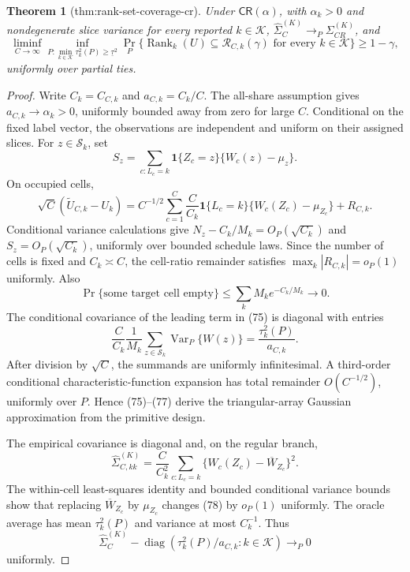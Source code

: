 \documentclass{article}
\newtheorem{theorem}{Theorem}
\begin{document}
\begin{theorem}[thm:rank-set-coverage-cr]\label{thm:rank-set-coverage-cr}
Under \(\mathsf{CR}(\alpha)\), with \(\alpha_k>0\) and nondegenerate slice variance for every reported \(k\in\mathcal K\), \(\widehat\Sigma_C^{(K)}\to_P\Sigma_{CR}^{(K)}\), and \[\liminf_{C\to\infty}\inf_{P:\min_{k\in\mathcal K}\tau_k^2(P)\geq\underline\tau^2}\Pr_P\{\operatorname{Rank}_k(U)\subseteq\mathcal R_{C,k}(\gamma)\text{ for every }k\in\mathcal K\}\geq1-\gamma,\] uniformly over partial ties.
\end{theorem}
\begin{proof}
Write \(C_k=C_{C,k}\) and \(a_{C,k}=C_k/C\).  The all-share assumption gives \(a_{C,k}\to\alpha_k>0\), uniformly bounded away from zero for large \(C\).  Conditional on the fixed label vector, the observations are independent and uniform on their assigned slices.  For \(z\in\mathcal S_k\), set
\[
S_z=\sum_{c:L_c=k}\mathbf1\{Z_c=z\}\{W_c(z)-\mu_z\}.
\]
On occupied cells,
\[
\sqrt C(\widetilde U_{C,k}-U_k)
=C^{-1/2}\sum_{c=1}^C\frac{C}{C_k}\mathbf1\{L_c=k\}
\{W_c(Z_c)-\mu_{Z_c}\}+R_{C,k}. \tag{75}
\]
Conditional variance calculations give \(N_z-C_k/M_k=O_P(\sqrt{C_k})\) and \(S_z=O_P(\sqrt{C_k})\), uniformly over bounded schedule laws.  Since the number of cells is fixed and \(C_k\asymp C\), the cell-ratio remainder satisfies \(\max_k|R_{C,k}|=o_P(1)\) uniformly.  Also
\[
\Pr\{\text{some target cell empty}\}
\leq\sum_kM_ke^{-C_k/M_k}\to0. \tag{76}
\]
The conditional covariance of the leading term in (75) is diagonal with entries
\[
\frac{C}{C_k}\frac1{M_k}\sum_{z\in\mathcal S_k}\operatorname{Var}_P\{W(z)\}
=\frac{\tau_k^2(P)}{a_{C,k}}. \tag{77}
\]
After division by \(\sqrt C\), the summands are uniformly infinitesimal.  A third-order conditional characteristic-function expansion has total remainder \(O(C^{-1/2})\), uniformly over \(P\).  Hence (75)--(77) derive the triangular-array Gaussian approximation from the primitive design.

The empirical covariance is diagonal and, on the regular branch,
\[
\widehat\Sigma_{C,kk}^{(K)}
=\frac{C}{C_k^2}\sum_{c:L_c=k}\{W_c(Z_c)-\overline W_{Z_c}\}^2. \tag{78}
\]
The within-cell least-squares identity and bounded conditional variance bounds show that replacing \(\overline W_{Z_c}\) by \(\mu_{Z_c}\) changes (78) by \(o_P(1)\) uniformly.  The oracle average has mean \(\tau_k^2(P)\) and variance at most \(C_k^{-1}\).  Thus
\[
\widehat\Sigma_C^{(K)}-
\operatorname{diag}(\tau_k^2(P)/a_{C,k}:k\in\mathcal K)\to_P0 \tag{79}
\]
uniformly.


\end{proof}
\end{document}
